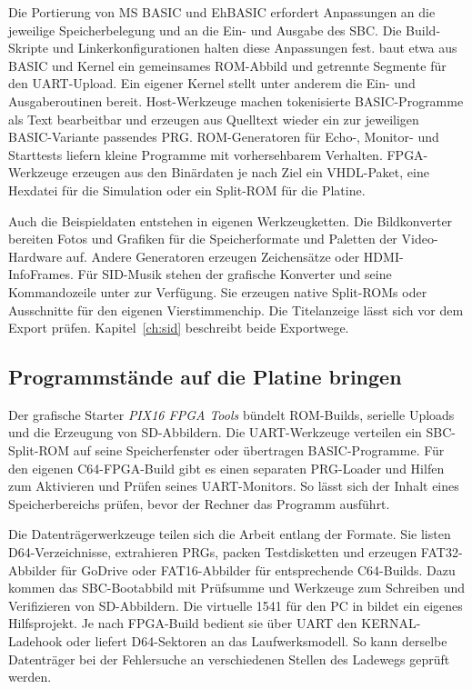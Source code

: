 \documentclass[fontsize=10.2bp,DIV=calc,oneside,open=any,headings=normal,numbers=noenddot]{scrbook}
\begin{document}
Die Portierung von MS BASIC und EhBASIC erfordert Anpassungen an die
jeweilige Speicherbelegung und an die Ein- und Ausgabe des SBC. Die
Build-Skripte und Linkerkonfigurationen halten diese Anpassungen fest.
 baut etwa aus BASIC und Kernel ein
gemeinsames ROM-Abbild und getrennte Segmente für den UART-Upload.
Ein eigener Kernel stellt unter anderem die Ein- und Ausgaberoutinen
bereit. Host-Werkzeuge machen tokenisierte BASIC-Programme als Text
bearbeitbar und erzeugen aus Quelltext wieder ein zur jeweiligen
BASIC-Variante passendes PRG. ROM-Generatoren für Echo-, Monitor- und
Starttests liefern kleine Programme mit vorhersehbarem Verhalten.
FPGA-Werkzeuge erzeugen aus den Binärdaten je nach Ziel ein VHDL-Paket,
eine Hexdatei für die Simulation oder ein Split-ROM für die Platine.

Auch die Beispieldaten entstehen in eigenen Werkzeugketten. Die
Bildkonverter bereiten Fotos und Grafiken für die Speicherformate und
Paletten der Video-Hardware auf. Andere Generatoren erzeugen
Zeichensätze oder HDMI-InfoFrames. Für SID-Musik stehen der grafische
Konverter und seine Kommandozeile unter  zur
Verfügung. Sie erzeugen native Split-ROMs oder Ausschnitte für den
eigenen Vierstimmenchip. Die Titelanzeige lässt sich vor dem Export
prüfen. Kapitel~\ref{ch:sid} beschreibt beide Exportwege.

\subsection{Programmstände auf die Platine bringen}

Der grafische Starter \emph{PIX16 FPGA Tools} bündelt ROM-Builds,
serielle Uploads und die Erzeugung von SD-Abbildern. Die UART-Werkzeuge
verteilen ein SBC-Split-ROM auf seine Speicherfenster oder übertragen
BASIC-Programme. Für den eigenen C64-FPGA-Build gibt es einen separaten
PRG-Loader und Hilfen zum Aktivieren und Prüfen seines UART-Monitors.
So lässt sich der Inhalt eines Speicherbereichs prüfen, bevor der
Rechner das Programm ausführt.

Die Datenträgerwerkzeuge teilen sich die Arbeit entlang der Formate.
Sie listen D64-Verzeichnisse, extrahieren PRGs, packen Testdisketten
und erzeugen FAT32-Abbilder für GoDrive oder FAT16-Abbilder für
entsprechende C64-Builds. Dazu kommen das SBC-Bootabbild mit Prüfsumme
und Werkzeuge zum Schreiben und Verifizieren von SD-Abbildern.
Die virtuelle 1541 für den PC in  bildet ein
eigenes Hilfsprojekt. Je nach FPGA-Build bedient sie über UART den
KERNAL-Ladehook oder liefert D64-Sektoren an das Laufwerksmodell.
So kann derselbe Datenträger bei der Fehlersuche an verschiedenen
Stellen des Ladewegs geprüft werden.
\end{document}
